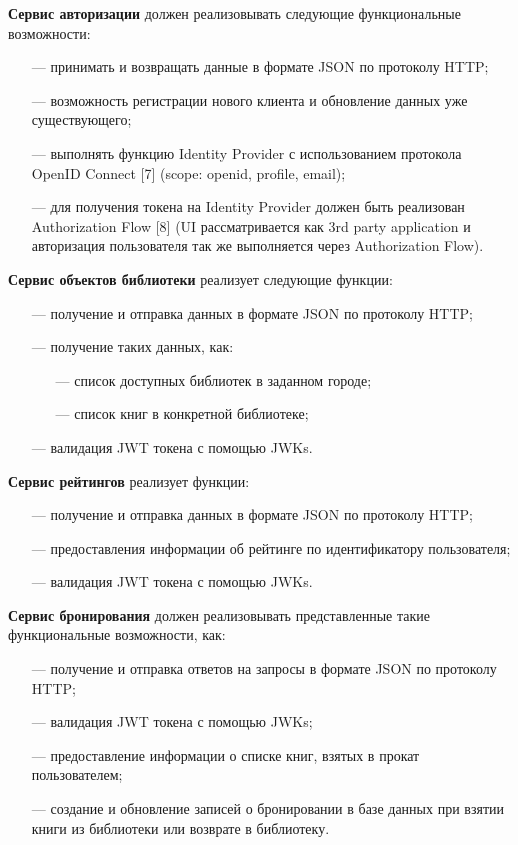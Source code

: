 \documentclass[a4paper, 12pt]{article}
\begin{document}
\begin{large}
\textbf{Сервис авторизации} должен реализовывать следующие функциональные возможности:
\begin{itemize}
	\item[---] принимать и возвращать данные в формате JSON по протоколу HTTP;
	\item[---] возможность регистрации нового клиента и обновление данных уже существующего;
	\item[---] выполнять функцию Identity Provider с использованием протокола OpenID Connect [7] (scope: openid, profile, email);
	\item[---] для получения токена на Identity Provider должен быть реализован Authorization Flow [8] (UI рассматривается как 3rd party application и авторизация пользователя так же выполняется через Authorization Flow).
\end{itemize}

\textbf{Сервис объектов библиотеки} реализует следующие функции:
\begin{itemize}
	\item[---] получение и отправка данных в формате JSON по протоколу HTTP;
	\item[---] получение таких данных, как:
	\begin{itemize}
		\item[---] список доступных библиотек в заданном городе;
		\item[---] список книг в конкретной библиотеке;
	\end{itemize}
	\item[---] валидация JWT токена с помощью JWKs.
\end{itemize}

\textbf{Сервис рейтингов} реализует функции:
\begin{itemize}
	\item[---] получение и отправка данных в формате JSON по протоколу HTTP;
	\item[---] предоставления информации об рейтинге по идентификатору пользователя;
	\item[---] валидация JWT токена с помощью JWKs.
\end{itemize}

\textbf{Сервис бронирования} должен реализовывать представленные такие функциональные возможности, как:
\begin{itemize}
	\item[---] получение и отправка ответов на запросы в формате JSON по протоколу HTTP;
	\item[---] валидация JWT токена с помощью JWKs;
	\item[---] предоставление информации о списке книг, взятых в прокат пользователем;
    \item[---] создание и обновление записей о бронировании в базе данных при взятии книги из библиотеки или возврате в библиотеку.
\end{itemize}


\end{large}
\end{document}
